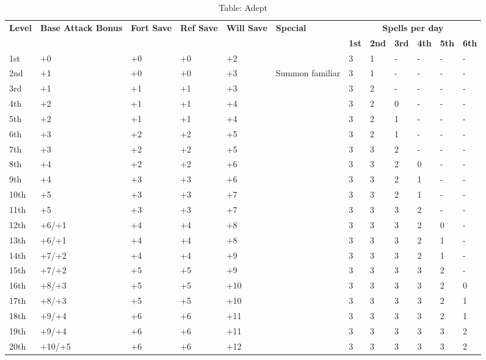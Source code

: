 \begin{table}[]
\sffamily
\caption{Table: Adept}
\begin{tabularx}{\linewidth}{lp{5em}p{1.5em}p{1.5em}p{1.5em}Xllllll}
\multirow{2}{*}{\textbf{Level}} & \multirow{2}{*}{\parbox{5em}{\textbf{Base Attack Bonus}}} & \multirow{2}{*}{\parbox{1.5em}{\textbf{Fort Save}}} & \multirow{2}{*}{\parbox{1.5em}{\textbf{Ref Save}}} & \multirow{2}{*}{\parbox{1.5em}{\textbf{Will Save}}} & \textbf{Special}                                                                                              & \multicolumn{6}{c}{\textbf{Spells per day}} \\
                       &                                    &                            &                           &                            &                                                                                                      & \textbf{1st}  & \textbf{2nd} & \textbf{3rd} &\textbf{4th} & \textbf{5th} & \textbf{6th} \\
1st & +0 & +0 & +0 & +2 &  & 3 & 1 & - & - & - & -\\
2nd & +1 & +0 & +0 & +3 & Summon familiar & 3 & 1 & - & - & - & -\\
3rd & +1 & +1 & +1 & +3 &  & 3 & 2 & - & - & - & -\\
4th & +2 & +1 & +1 & +4 &  & 3 & 2 & 0 & - & - & -\\
5th & +2 & +1 & +1 & +4 &  & 3 & 2 & 1 & - & - & -\\
6th & +3 & +2 & +2 & +5 &  & 3 & 2 & 1 & - & - & -\\
7th & +3 & +2 & +2 & +5 &  & 3 & 3 & 2 & - & - & -\\
8th & +4 & +2 & +2 & +6 &  & 3 & 3 & 2 & 0 & - & -\\
9th & +4 & +3 & +3 & +6 &  & 3 & 3 & 2 & 1 & - & -\\
10th & +5 & +3 & +3 & +7 &  & 3 & 3 & 2 & 1 & - & -\\
11th & +5 & +3 & +3 & +7 &  & 3 & 3 & 3 & 2 & - & -\\
12th & +6/+1 & +4 & +4 & +8 &  & 3 & 3 & 3 & 2 & 0 & -\\
13th & +6/+1 & +4 & +4 & +8 &  & 3 & 3 & 3 & 2 & 1 & -\\
14th & +7/+2 & +4 & +4 & +9 &  & 3 & 3 & 3 & 2 & 1 & -\\
15th & +7/+2 & +5 & +5 & +9 &  & 3 & 3 & 3 & 3 & 2 & -\\
16th & +8/+3 & +5 & +5 & +10 &  & 3 & 3 & 3 & 3 & 2 & 0\\
17th & +8/+3 & +5 & +5 & +10 &  & 3 & 3 & 3 & 3 & 2 & 1\\
18th & +9/+4 & +6 & +6 & +11 &  & 3 & 3 & 3 & 3 & 2 & 1\\
19th & +9/+4 & +6 & +6 & +11 &  & 3 & 3 & 3 & 3 & 3 & 2\\
20th & +10/+5 & +6 & +6 & +12 &  & 3 & 3 & 3 & 3 & 3 & 2\\
\end{tabularx}
\end{table}

